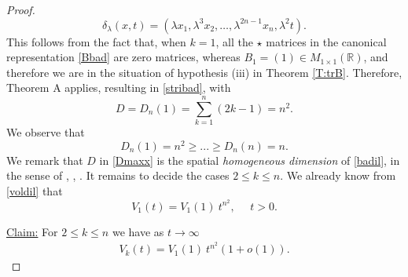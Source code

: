 \documentclass[11pt,letter]{amsart}
\def \R {\mathbb{R}}
\numberwithin{equation}{section}
\numberwithin{equation}{section}
\begin{document}
\begin{proof}
\begin{equation}\label{badil}
\delta_\lambda(x,t) = \left(\lambda
x_1,\lambda^3
x_2,\ldots,\lambda^{2n-1}x_n,\lambda^2t\right).
\end{equation}
This follows from the fact that, when $k=1$, all the $\star$ matrices in  the canonical representation \eqref{Bbad} are zero matrices, whereas $B_1 = (1)\in M_{1\times 1}(\R)$, and therefore we are in the situation of hypothesis (iii) in Theorem \ref{T:trB}. Therefore, Theorem A applies, resulting in \eqref{stribad}, with
\begin{equation}\label{Dmaxx}
D = D_n(1) = \sum_{k=1}^{n} (2k - 1) = n^2.
\end{equation}
We observe that 
\begin{equation}\label{stack}
D_n(1)  = n^2\ge ...\ge D_n(n) = n.
\end{equation}
We remark that $D$ in \eqref{Dmaxx} is the spatial \emph{homogeneous dimension} of \eqref{badil}, in the sense of  \cite{RS}, \cite{FS}, \cite{NSW}.
It remains to decide the cases $2\le k\le n$. We already know from \eqref{voldil} that
\[
V_1(t) = V_1(1)\ t^{n^2}, \ \ \ \ \ \ t>0.
\]

\vskip 0.2in

\noindent \underline{Claim:} For $2\le k\le n$ we have as $t\to \infty$
\begin{align}\label{detQinfDym}
V_k(t) = V_{1}(1)\ t^{n^{2}}(1+o(1)).
\end{align}

\vskip 0.2in


\end{proof}
\end{document}
